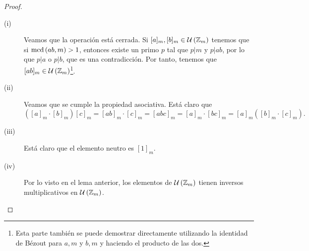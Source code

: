 \begin{proof}
\begin{description}
	\item[(i)] Veamos que la operación está cerrada. Si $\displaystyle [a]_{m}, [b]_{m} \in \mathcal{U}\left(\mathbb{Z}_{m}\right) $ tenemos que si $\displaystyle \text{mcd}\left(ab,m\right) > 1 $, entonces existe un primo $\displaystyle p $ tal que $\displaystyle p | m $ y $\displaystyle p | ab $, por lo que $\displaystyle p | a $ o $\displaystyle p | b $, que es una contradicción. Por tanto, tenemos que $\displaystyle [ab]_{m} \in \mathcal{U}\left(\mathbb{Z}_{m}\right) $\footnote{Esta parte también se puede demostrar directamente utilizando la identidad de Bézout para $\displaystyle a,m $ y $\displaystyle b,m $ y haciendo el producto de las dos.}.
	\item[(ii)] Veamos que se cumple la propiedad asociativa. Está claro que
		\[\left([a]_{m} \cdot [b]_{m}\right)[c]_{m} = [ab]_{m} \cdot [c]_{m} = [abc]_{m} = [a]_{m} \cdot [bc]_{m} = [a]_{m}\left([b]_{m} \cdot [c]_{m }\right) .\]
	\item[(iii)] Está claro que el elemento neutro es $\displaystyle [1]_{m} $.
	\item[(iv)] Por lo visto en el lema anterior, los elementos de $\displaystyle \mathcal{U}\left(\mathbb{Z}_{m}\right) $ tienen inversos multiplicativos en $\displaystyle \mathcal{U}\left(\mathbb{Z}_{m}\right)$.
\end{description}
\end{proof}

